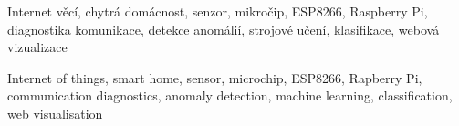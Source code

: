
\begin{keywords_cs}
\vspace{1cm}

Internet věcí, chytrá domácnost, senzor, mikročip, ESP8266, Raspberry Pi, diagnostika komunikace, detekce anomálií, strojové učení, klasifikace, webová vizualizace

\vspace{1cm}
\end{keywords_cs}

\begin{keywords_en}
\vspace{1cm}

Internet of things, smart home, sensor, microchip, ESP8266, Rapberry Pi, communication diagnostics, anomaly detection, machine learning, classification, web visualisation

\end{keywords_en}